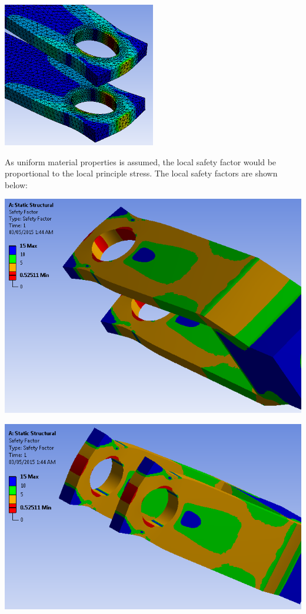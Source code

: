 \documentclass[a4paper,14pt]{extarticle}
\begin{document}
\begin{center}\includegraphics[width=0.5\textwidth]{LOCAL_STRESS.PNG}\end{center}

As uniform material properties is assumed, the local safety factor would be proportional to the local principle stress. The local safety factors are shown below:

\includegraphics[width=\textwidth]{SF_1.PNG}

\includegraphics[width=\textwidth]{SF_2.PNG}
\end{document}
